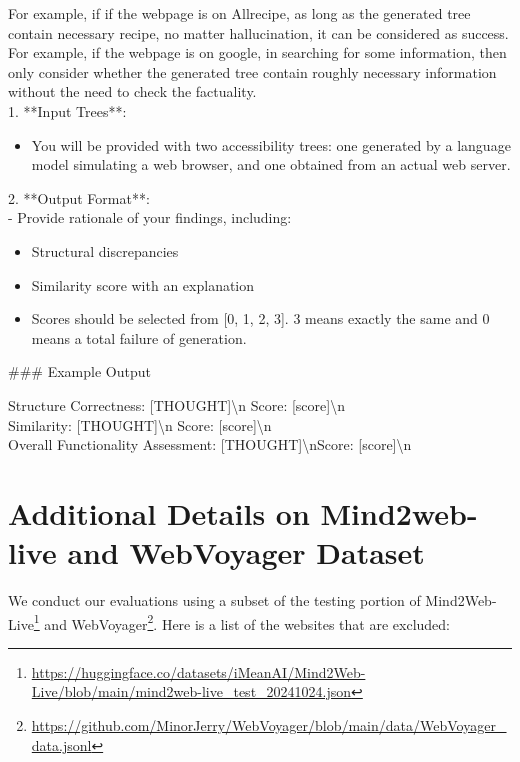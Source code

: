 \documentclass[11pt]{article}
\begin{document}
\begin{tcolorbox}[colback=blue!5!white, colframe=blue!75!black, breakable, title = {\textsc{World Model Intrinsic Evaluation}}]
For example, if if the webpage is on Allrecipe, as long as the generated tree contain necessary recipe, no matter hallucination, it can be considered as success.
For example, if the webpage is on google, in searching for some information, then only consider whether the generated tree contain roughly necessary information without the need to check the factuality.\\

1. **Input Trees**:
\begin{itemize}[leftmargin=*]
   \item You will be provided with two accessibility trees: one generated by a language model simulating a web browser, and one obtained from an actual web server.
\end{itemize}

2. **Output Format**:\\
- Provide rationale of your findings, including:
\begin{itemize}[leftmargin=*]
     \item Structural discrepancies
     \item Similarity score with an explanation
     \item Scores should be selected from [0, 1, 2, 3]. 3 means exactly the same and 0 means a total failure of generation.
\end{itemize}


\#\#\# Example Output

Structure Correctness: [THOUGHT]\textbackslash n Score: [score]\textbackslash n \\
Similarity: [THOUGHT]\textbackslash n Score: [score]\textbackslash n \\
Overall Functionality Assessment: [THOUGHT]\textbackslash nScore: [score]\textbackslash n 
\end{tcolorbox}






\section{Additional Details on Mind2web-live and WebVoyager Dataset} \label{app:website_filter}

We conduct our evaluations using a subset of the testing portion of Mind2Web-Live\footnote{\url{https://huggingface.co/datasets/iMeanAI/Mind2Web-Live/blob/main/mind2web-live_test_20241024.json}} and WebVoyager\footnote{\url{https://github.com/MinorJerry/WebVoyager/blob/main/data/WebVoyager_data.jsonl}}. 
Here is a list of the websites that are excluded:
\end{document}

